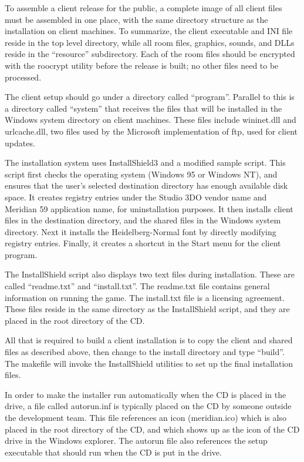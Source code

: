 To assemble a client release for the public, a complete image of all
client files must be assembled in one place, with the same directory
structure as the installation on client machines.  To summarize, the
client executable and INI file reside in the top level directory,
while all room files, graphics, sounds, and DLLs reside in the
``resource'' subdirectory.  Each of the room files should be encrypted
with the roocrypt utility before the release is built; no other files
need to be processed.

The client setup should go under a directory called ``program''.
Parallel to this is a directory called ``system'' that receives the
files that will be installed in the Windows system directory on client
machines.  These files include wininet.dll and urlcache.dll, two files
used by the Microsoft implementation of ftp, used for client updates.

The installation system uses InstallShield3 and a modified sample
script.  This script first checks the operating system (Windows 95 or
Windows NT), and ensures that the user's selected destination
directory has enough available disk space.  It creates registry
entries under the Studio 3DO vendor name and Meridian 59 application
name, for uninstallation purposes.  It then installs client files in
the destination directory, and the shared files in the Windows system
directory.  Next it installs the Heidelberg-Normal font by directly
modifying registry entries.  Finally, it creates a shortcut in the
Start menu for the client program.

The InstallShield script also displays two text files during
installation.  These are called ``readme.txt'' and ``install.txt''.
The readme.txt file contains general information on running the game.
The install.txt file is a licensing agreement.  These files reside in
the same directory as the InstallShield script, and they are placed in
the root directory of the CD.

All that is required to build a client installation is to copy the
client and shared files as described above, then change to the
install directory and type ``build''.  The makefile will invoke the
InstallShield utilities to set up the final installation files.

In order to make the installer run automatically when the CD is placed
in the drive, a file called autorun.inf is typically placed on the CD
by someone outside the development team.  This file references an icon
(meridian.ico) which is also placed in the root directory of the CD,
and which shows up as the icon of the CD drive in the Windows
explorer.  The autorun file also references the setup executable that
should run when the CD is put in the drive.
